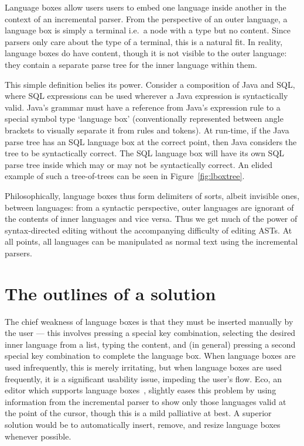 \documentclass[sigplan,screen]{acmart}\settopmatter{printfolios=true,printccs=false,printacmref=false}
\begin{document}
Language boxes allow users users to embed one language inside another in the
context of an incremental parser. From the perspective of an outer language, a
language box is simply a terminal i.e.~a node with a type but no content. Since
parsers only care about the type of a terminal, this is a natural fit. In
reality, language boxes do have content, though it is not visible to the outer
language: they contain a separate parse tree for the inner language within
them.

This simple definition belies its power. Consider a composition of Java and
SQL, where SQL expressions can be used wherever a Java expression is
syntactically valid. Java's grammar must have a reference from Java's
expression rule to a special symbol type `language box' (conventionally
represented between angle brackets to visually separate it from rules and
tokens). At run-time, if the Java parse tree has an SQL language box at the
correct point, then Java considers the tree to be syntactically correct. The
SQL language box will have its own SQL parse tree inside which may or may not
be syntactically correct. An elided example of such a tree-of-trees can be seen
in Figure~\ref{fig:lboxtree}.

Philosophically, language boxes thus form delimiters of sorts, albeit invisible
ones, between languages: from a syntactic perspective, outer languages are
ignorant of the contents of inner languages and vice versa. Thus we get much of
the power of syntax-directed editing without the accompanying difficulty of
editing ASTs. At all points, all languages can be manipulated as normal text
using the incremental parsers.


\section{The outlines of a solution}

\label{the problem}
The chief weakness of language boxes is that they must be inserted
manually by the user --- this involves pressing a special key combination,
selecting the desired inner language from a list, typing the content, and (in
general) pressing a second special key combination to complete the language box.
When language boxes are used infrequently, this is merely irritating,
but when language boxes are used frequently, it is a significant usability
issue, impeding the user's flow. Eco, an editor which supports language boxes~\cite{diekmann14eco},
slightly eases this problem by using information from the incremental parser to
show only those languages valid at the point of the cursor,
though this is a mild palliative at best. A superior solution would be
to automatically insert, remove, and resize language boxes whenever possible.
\end{document}
